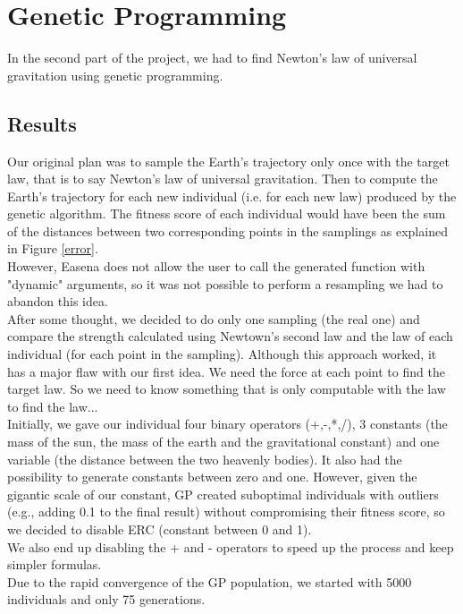 \section{Genetic Programming}
In the second part of the project, we had to find Newton's law of universal
gravitation using genetic programming.

\subsection{Results}
Our original plan was to sample the Earth's trajectory only once with the
target law, that is to say Newton's law of universal gravitation. Then to compute the Earth's trajectory for each new individual (i.e. for each new law) produced by the genetic algorithm. The fitness score of each individual would have been the sum of the distances between two corresponding points in the samplings as explained in Figure \ref{error}.\\

However, Easena does not allow the user to call the generated function with
"dynamic" arguments, so it was not possible to perform a resampling we had to
abandon this idea.\\
After some thought, we decided to do only one sampling (the real one) and
compare the strength calculated using Newtown's second law and the law of each
individual (for each point in the sampling). Although this approach worked, it
has a major flaw with our first idea. We need the force at each point to find
the target law. So we need to know something that is only computable with the
law to find the law...\\

Initially, we gave our individual four binary operators (+,-,*,/), 3 constants
(the mass of the sun, the mass of the earth and the gravitational constant) and
one variable (the distance between the two heavenly bodies). It also had the
possibility to generate constants between zero and one. However, given the
gigantic scale of our constant, GP created suboptimal individuals with outliers
(e.g., adding 0.1 to the final result) without compromising their fitness
score, so we decided to disable ERC (constant between 0 and 1).\\
We also end up disabling the + and - operators to speed up the process and keep
simpler formulas.\\

Due to the rapid convergence of the GP population, we started with 5000
individuals and only 75 generations.\\

